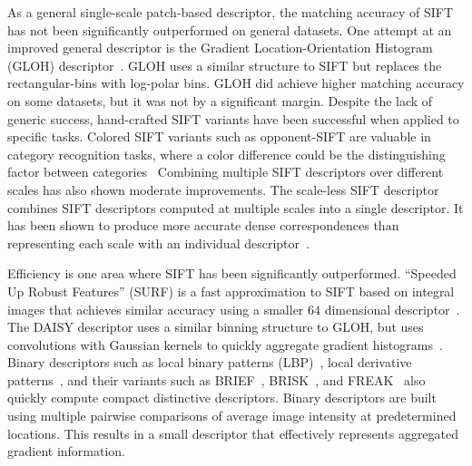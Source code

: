         As a general single-scale patch-based descriptor, the matching
          accuracy of SIFT has not been significantly outperformed on
          general datasets.
        One attempt at an improved general descriptor is the Gradient
          Location-Orientation Histogram (GLOH)
          descriptor~\cite{mikolajczyk_performance_2005}.
        GLOH uses a similar structure to SIFT but replaces the
          rectangular-bins with log-polar bins.
        GLOH did achieve higher matching accuracy on some datasets, but
          it was not by a significant margin.
        Despite the lack of generic success, hand-crafted SIFT variants
          have been successful when applied to specific tasks.
        Colored SIFT variants such as opponent-SIFT are valuable in
          category recognition tasks, where a color difference could be
          the distinguishing factor between
          categories~\cite{van_de_sande_evaluating_2010}
        Combining multiple SIFT descriptors over different scales has
          also shown moderate improvements.
        The scale-less SIFT descriptor combines SIFT descriptors
          computed at multiple scales into a single descriptor.
        It has been shown to produce more accurate dense
          correspondences than representing each scale with an individual
          descriptor~\cite{hassner_sifts_2012}.

        Efficiency is one area where SIFT has been significantly outperformed.
        ``Speeded Up Robust Features'' (SURF) is a fast approximation to SIFT
          based on integral images that achieves similar accuracy using a
          smaller $64$ dimensional descriptor~\cite{bay_surf_2006}.
        The DAISY descriptor uses a similar binning structure to GLOH, but
          uses convolutions with Gaussian kernels to quickly aggregate gradient
          histograms~\cite{tola_fast_2008}.
        Binary descriptors such as local binary patterns
          (LBP)~\cite{ojala_comparative_1996, zhang_local_2010}, local
          derivative patterns~\cite{heikkila_description_2009}, and their
          variants such as BRIEF~\cite{calonder_brief_2010},
          BRISK~\cite{leutenegger_brisk_2011}, and FREAK~\cite{alahi_freak_2012}
          also quickly compute compact distinctive descriptors.
        Binary descriptors are built using multiple pairwise comparisons of
          average image intensity at predetermined locations.
        This results in a small descriptor that effectively represents
          aggregated gradient information.

